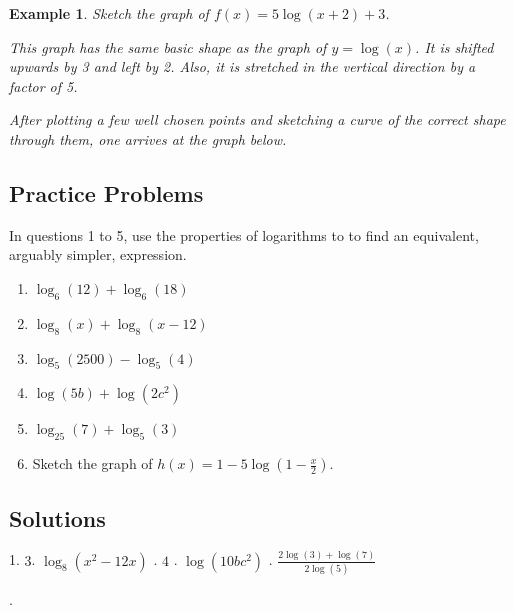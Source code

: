 \documentclass[11pt]{book}               %
\newtheorem{example}{Example}
\begin{document}
\begin{example}
Sketch the graph of $f(x) = 5\log(x+2) + 3$.

\normalfont
This graph has the same basic shape as the graph of $y = \log(x)$.
It is shifted upwards by 3 and left by 2.
Also, it is stretched in the vertical direction by a factor of 5.

After plotting a few well chosen points and sketching a curve of the correct shape through them,
one arrives at the graph below.

\begin{center}
\end{center}
\end{example}
 
\subsection{Practice Problems}
In questions 1 to 5, use the properties of logarithms to to find an equivalent, arguably simpler, expression.
\begin{enumerate}
\item $ \log_{6}{(12)} + \log_{6}{(18)} $ 
\item $ \log_8(x) + \log_8(x - 12)  $ 
\item $\log_{5}{(2500)} - \log_{5}{(4)} $ 
\item $   \log(5b) + \log(2c^2) $ 
\item $ \log_{25}{(7)} + \log_5{(3)} $ 

\bigskip
\item Sketch the graph of  $ h(x)=1-5\log{(1-\frac{x}{2})}$.
\end{enumerate}

\newpage
\subsection{Solutions} 
1. $3$. $\log_{8}{(x^2-12x)}$ . $4$ . $\log(10bc^2)$ . $\frac{2\log{(3)}+\log{(7)}}{2\log{(5)}}$

. 
\begin{center}
\end{center}
\end{document}

